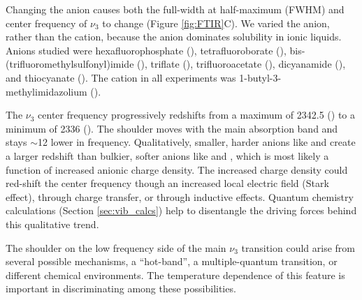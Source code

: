 {Changing the anion causes both the full-width at half-maximum (FWHM) and center frequency of $\nu_3$ to change (Figure \ref{fig:FTIR}C). We varied the anion, rather than the cation, because the anion dominates  solubility in ionic liquids.\cite{anthonyJPCB-05,cadenaJACS-04,Bhargava2007}} Anions studied were hexafluorophosphate (), tetrafluoroborate (), bis-(trifluoromethyl\-sulfonyl)imide (), triflate (), trifluoroacetate (), dicyanamide (), and thiocyanate (). The cation in all experiments was 1-butyl-3-methylimidazolium (\ce{[Im_{4,1}]}).

The $\nu_3$ center frequency progressively redshifts from a maximum of \SI{2342.5}{\wavenumber} (\ce{[PF6-]}) to a minimum of \SI{2336}{\wavenumber} (\ce{[SCN]-}). The shoulder moves with the main absorption band and stays $\sim$\SI{12}{\wavenumber} lower in frequency.  Qualitatively, smaller, harder anions like \ce{[SCN]-} and \ce{[DCA]-} create a larger redshift than bulkier, softer anions like \ce{[Tf2N]-} and \ce{[TfO]-}, which is most likely a function of increased anionic charge density. The increased charge density could red-shift the  center frequency though an increased local electric field (Stark effect), through charge transfer, or through inductive effects. Quantum chemistry calculations (Section \ref{sec:vib_calcs}) help to disentangle the driving forces behind this qualitative trend.

The shoulder on the low frequency side of the main $\nu_3$ transition could arise from several possible mechanisms, a ``hot-band'', a multiple-quantum transition, or different chemical environments. The temperature dependence of this feature is important in discriminating among these possibilities.

